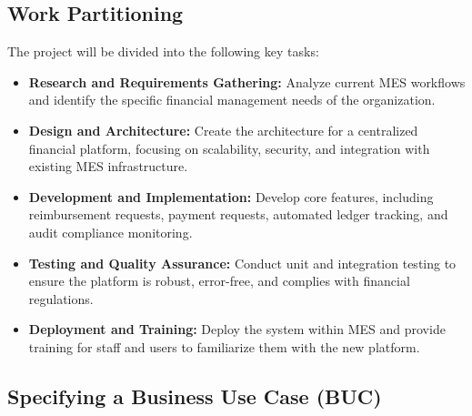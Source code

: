\documentclass[12pt]{article}
\begin{document}
\subsection{Work Partitioning}
The project will be divided into the following key tasks:
\begin{itemize}
    \item \textbf{Research and Requirements Gathering:} Analyze current MES workflows and identify the specific financial management needs of the organization.
    \item \textbf{Design and Architecture:} Create the architecture for a centralized financial platform, focusing on scalability, security, and integration with existing MES infrastructure.
    \item \textbf{Development and Implementation:} Develop core features, including reimbursement requests, payment requests, automated ledger tracking, and audit compliance monitoring.
    \item \textbf{Testing and Quality Assurance:} Conduct unit and integration testing to ensure the platform is robust, error-free, and complies with financial regulations.
    \item \textbf{Deployment and Training:} Deploy the system within MES and provide training for staff and users to familiarize them with the new platform.
\end{itemize}

\subsection{Specifying a Business Use Case (BUC)}
\end{document}
